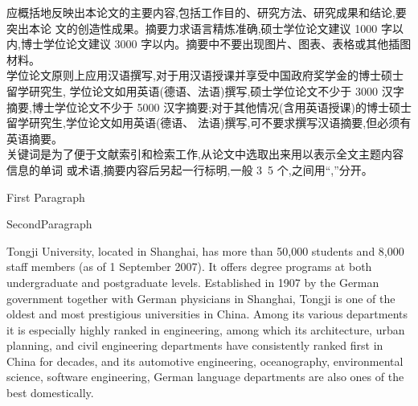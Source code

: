 
\begin{cabstract}
应概括地反映出本论文的主要内容,包括工作目的、研究方法、研究成果和结论,要突出本论
 文的创造性成果。摘要力求语言精炼准确,硕士学位论文建议 1000
  字以内,博士学位论文建议 3000 字以内。摘要中不要出现图片、图表、表格或其他插图材料。\\

学位论文原则上应用汉语撰写,对于用汉语授课并享受中国政府奖学金的博士硕士留学研究生, 学位论文如用英语(德语、法语)撰写,硕士学位论文不少于 3000 汉字摘要,博士学位论文不少于 5000 汉字摘要;对于其他情况(含用英语授课)的博士硕士留学研究生,学位论文如用英语(德语、 法语)撰写,可不要求撰写汉语摘要,但必须有英语摘要。\\

关键词是为了便于文献索引和检索工作,从论文中选取出来用以表示全文主题内容信息的单词 或术语,摘要内容后另起一行标明,一般 3~5 个,之间用“,”分开。 \\

\end{cabstract}

\begin{eabstract}
First Paragraph

SecondParagraph

Tongji University, located in Shanghai, has more than 50,000 students and 8,000 staff members (as of 1 September 2007). It offers degree programs at both undergraduate and postgraduate levels. Established in 1907 by the German government together with German physicians in Shanghai, Tongji is one of the oldest and most prestigious universities in China. Among its various departments it is especially highly ranked in engineering, among which its architecture, urban planning, and civil engineering departments have consistently ranked first in China for decades, and its automotive engineering, oceanography, environmental science, software engineering, German language departments are also ones of the best domestically.

\end{eabstract}
